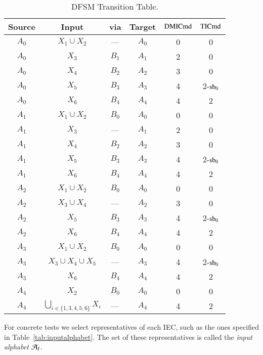 \begin{table}[htdp]
\caption{DFSM Transition Table.}
\begin{center}
\begin{tabular}{|c||c||c||c||c|c|}
\hline\hline
{\bf Source}& {\bf Input} & {\bf via} & {\bf Target}&$\mathbf{\text{DMICmd}}$&$\mathbf{\text{TICmd}}$ \\\hline\hline
$A_0$&$X_1\cup X_2$& --- & $A_0$&0&0 \\
$A_0$&$X_3$& $B_1$ &$A_1$&2&0\\
$A_0$&$X_4$& $B_2$  &$A_2$&3&0\\
$A_0$&$X_5$& $B_3$  &$A_3$&4&2-$\text{sb}_0$ \\
$A_0$&$X_6$& $B_4$ &$A_4$&4&2 \\

\hline
$A_1$&$X_1\cup X_2$& $B_0$ &$A_0$&0&0\\
$A_1$&$X_3$& --- & $A_1$&2&0 \\
$A_1$&$X_4$& $B_2$ & $A_2$&3&0 \\
$A_1$&$X_5$& $B_3$ & $A_3$&4&2-$\text{sb}_0$ \\
$A_1$&$X_6$& $B_4$ &$A_4$&4&2\\
\hline
$A_2$&$X_1\cup X_2$& $B_0$ &$A_0$&0&0 \\
$A_2$&$X_3\cup X_4$& --- &$A_2$&3&0 \\
$A_2$&$X_5$& $B_3$ & $A_3$&4&2-$\text{sb}_0$\\
$A_2$&$X_6$& $B_4$ &$A_4$&4&2 \\
\hline
$A_3$&$X_1\cup X_2$& $B_0$ &$A_0$&0&0\\
$A_3$&$X_3\cup X_4\cup X_5$& --- &$A_3$&4&2-$\text{sb}_0$ \\
$A_3$&$X_6$& $B_4$ &$A_4$&4&2 \\
\hline
$A_4$&$X_2$& $B_0$ &$A_0$&0&0\\
$A_4$&$\bigcup_{i\in\{1,3,4,5,6\}}X_i$& --- &$A_4$&4&2 
\\\hline\hline
\end{tabular}
\end{center}
\label{tab:tr}
\end{table}

For concrete tests we select representatives of each IEC, such as the ones specified in Table~\ref{tab:inputalphabet}. The set of these representatives is called the {\it input alphabet} ${\cal A}_I$.


